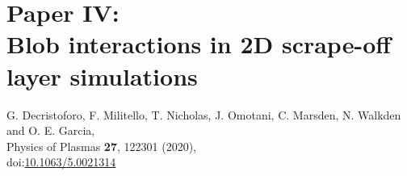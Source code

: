 \documentclass[11pt,twoside,openright]{book}
\begin{document}
  \newpage

  \null

  \newpage

  

  \chapter{Paper IV: \\ Blob interactions in 2D scrape-off layer simulations}
   G. Decristoforo, F. Militello, T. Nicholas, J. Omotani, C.
  Marsden, N. Walkden and O. E. Garcia,\\ Physics of Plasmas {\bf 27}, 122301 (2020),\\
  doi:\href{https://doi.org/10.1063/5.0021314}{10.1063/5.0021314}

  \newpage

  \null

  \newpage

\end{document}
